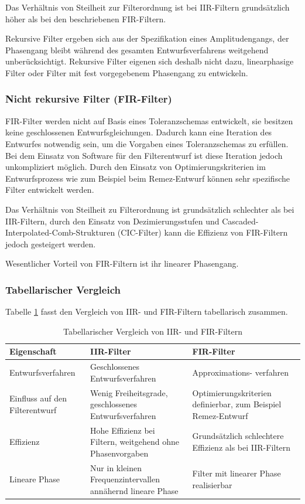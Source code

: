Das Verhältnis von Steilheit zur Filterordnung ist bei IIR-Filtern grundsätzlich höher als bei den beschriebenen FIR-Filtern.

Rekursive Filter ergeben sich aus der Spezifikation eines Amplitudengangs, der Phasengang bleibt während des gesamten Entwurfsverfahrens weitgehend unberücksichtigt. Rekursive Filter eigenen sich deshalb nicht dazu, linearphasige Filter oder Filter mit fest vorgegebenem Phasengang zu entwickeln.

\subsubsection{Nicht rekursive Filter (FIR-Filter)}\label{sec:nicht-rekursive-filter-fir-filter}

FIR-Filter werden nicht auf Basis eines Toleranzschemas entwickelt, sie besitzen keine geschlossenen Entwurfsgleichungen. Dadurch kann eine Iteration des Entwurfes notwendig sein, um die Vorgaben eines Toleranzschemas zu erfüllen. Bei dem Einsatz von Software für den Filterentwurf ist diese Iteration jedoch unkompliziert möglich. Durch den Einsatz von Optimierungskriterien im Entwurfsprozess wie zum Beispiel beim Remez-Entwurf können sehr spezifische Filter entwickelt werden.

Das Verhältnis von Steilheit zu Filterordnung ist grundsätzlich schlechter als bei IIR-Filtern, durch den Einsatz von Dezimierungsstufen und Cascaded-Interpolated-Comb-Strukturen (CIC-Filter) kann die Effizienz von FIR-Filtern jedoch gesteigert werden.

Wesentlicher Vorteil von FIR-Filtern ist ihr linearer Phasengang.

\subsubsection{Tabellarischer Vergleich}\label{sec:tabellarischer-vergleich}

Tabelle \ref{tab:9.9} fasst den Vergleich von IIR- und FIR-Filtern tabellarisch zusammen.

\begin{table}
  \centering
  \caption{Tabellarischer Vergleich von IIR- und FIR-Filtern}
  \label{tab:9.9}
  \begin{tabular}{lll}
    \toprule
    Eigenschaft & IIR-Filter & FIR-Filter \\
    \midrule
    Entwurfsverfahren & 
Geschlossenes 
Entwurfsverfahren
 & 
Approximations- 
verfahren \\
    Einfluss auf den Filterentwurf & 
Wenig Freiheitsgrade, 
geschlossenes Entwurfsverfahren
 & Optimierungskriterien definierbar, zum Beispiel Remez-Entwurf \\
    Effizienz & 
Hohe Effizienz bei Filtern, 
weitgehend ohne Phasenvorgaben
 & 
Grundsätzlich schlechtere 
Effizienz als bei IIR-Filtern \\
    Lineare Phase & Nur in kleinen Frequenzintervallen annähernd lineare Phase & 
Filter mit linearer Phase 
realisierbar \\
    \bottomrule
  \end{tabular}
\end{table}

